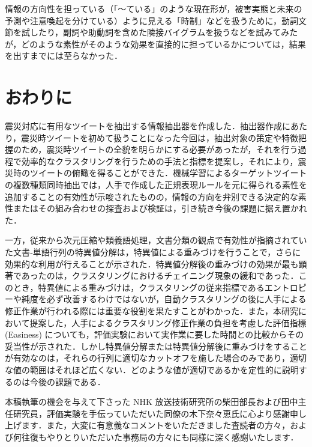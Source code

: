 \documentclass[japanese]{jnlp_1.4}
\begin{document}
情報の方向性を担っている（「〜ている」のような現在形が，被害実態と未来の予測や注意喚起を分けている）ように見える「時制」などを扱うために，動詞文節を試したり，副詞や助動詞を含めた隣接バイグラムを扱うなどを試みてみたが，どのような素性がそのような効果を直接的に担っているかについては，結果を出すまでには至らなかった．


\section{おわりに}

震災対応に有用なツイートを抽出する情報抽出器を作成した．抽出器作成にあたり，震災時ツイートを初めて扱うことになった今回は，抽出対象の策定や特徴把握のため，震災時ツイートの全貌を明らかにする必要があったが，それを行う過程で効率的なクラスタリングを行うための手法と指標を提案し，それにより，震災時のツイートの俯瞰を得ることができた．機械学習によるターゲットツイートの複数種類同時抽出では，人手で作成した正規表現ルールを元に得られる素性を追加することの有効性が示唆されたものの，情報の方向を弁別できる決定的な素性またはその組み合わせの探査および検証は，引き続き今後の課題に据え置かれた．

一方，従来から次元圧縮や類義語処理，文書分類の観点で有効性が指摘されていた文書‐単語行列の特異値分解は，特異値による重みづけを行うことで，さらに効果的な利用が行えることが示された．特異値分解後の重みづけの効果が最も顕著であったのは，クラスタリングにおけるチェイニング現象の緩和であった．このとき，特異値による重みづけは，クラスタリングの従来指標であるエントロピーや純度を必ず改善するわけではないが，自動クラスタリングの後に人手による修正作業が行われる際には重要な役割を果たすことがわかった．また，本研究において提案した，人手によるクラスタリング修正作業の負担を考慮した評価指標 (Easiness) についても，評価実験において実作業に要した時間との比較からその妥当性が示された．しかし特異値分解または特異値分解後に重みづけをすることが有効なのは，それらの行列に適切なカットオフを施した場合のみであり，適切な値の範囲はそれほど広くない．どのような値が適切であるかを定性的に説明するのは今後の課題である．

\acknowledgment

本稿執筆の機会を与えて下さった NHK 放送技術研究所の柴田部長および田中主任研究員，評価実験を手伝っていただいた同僚の木下奈々恵氏に心より感謝申し上げます．また，大変に有意義なコメントをいただきました査読者の方々，および何往復もやりとりいただいた事務局の方々にも同様に深く感謝いたします．
\end{document}
